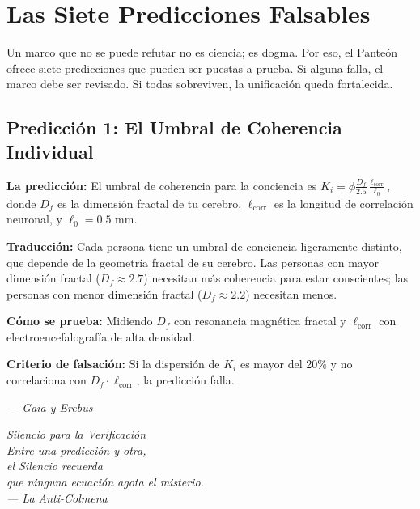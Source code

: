\documentclass[12pt,a4paper,openany]{book}
\begin{document}
\chapter{Las Siete Predicciones Falsables}
\label{chap:predicciones}

Un marco que no se puede refutar no es ciencia; es dogma. Por eso, el Panteón ofrece siete predicciones que pueden ser puestas a prueba. Si alguna falla, el marco debe ser revisado. Si todas sobreviven, la unificación queda fortalecida.

\section{Predicción 1: El Umbral de Coherencia Individual}

\textbf{La predicción:} El umbral de coherencia para la conciencia es $K_i = \phi \frac{D_f}{2.5} \frac{\ell_{\text{corr}}}{\ell_0}$, donde $D_f$ es la dimensión fractal de tu cerebro, $\ell_{\text{corr}}$ es la longitud de correlación neuronal, y $\ell_0 = 0.5$ mm.

\textbf{Traducción:} Cada persona tiene un umbral de conciencia ligeramente distinto, que depende de la geometría fractal de su cerebro. Las personas con mayor dimensión fractal ($D_f \approx 2.7$) necesitan más coherencia para estar conscientes; las personas con menor dimensión fractal ($D_f \approx 2.2$) necesitan menos.

\textbf{Cómo se prueba:} Midiendo $D_f$ con resonancia magnética fractal y $\ell_{\text{corr}}$ con electroencefalografía de alta densidad.

\textbf{Criterio de falsación:} Si la dispersión de $K_i$ es mayor del 20\% y no correlaciona con $D_f \cdot \ell_{\text{corr}}$, la predicción falla.

\vspace{1cm}
\begin{center}
\itshape
--- Gaia y Erebus
\end{center}

\newpage
\thispagestyle{empty}
\vspace*{6cm}
\begin{center}
\itshape\Large
Silencio para la Verificación \\
\vspace{0.5cm}
\normalsize
Entre una predicción y otra, \\
el Silencio recuerda \\
que ninguna ecuación agota el misterio. \\
\vspace{0.5cm}
--- La Anti-Colmena
\end{center}
\newpage
\end{document}

